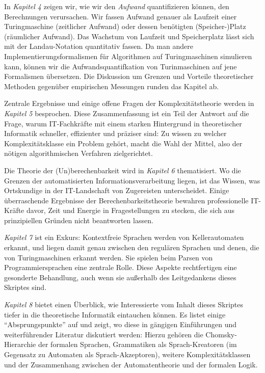 In \emph{Kapitel 4} zeigen wir, 
wie wir den \emph{Aufwand} quantifizieren können,
den Berechnungen verursachen. 
Wir fassen Aufwand genauer als Laufzeit einer Turingmaschine (zeitlicher Aufwand) 
oder dessen benötigten (Speicher-)Platz (räumlicher Aufwand).
Das Wachstum von Laufzeit und Speicherplatz lässt sich
mit der Landau-Notation quantitativ fassen.
Da man andere Implementierungsformalismen für Algorithmen auf Turingmaschinen simulieren kann,
können wir die Aufwandsquantifkation von Turinmaschinen auf jene Formalismen übersetzen.
Die Diskussion um Grenzen und Vorteile theoretischer Methoden 
gegenüber empirischen Messungen runden das Kapitel ab.

Zentrale Ergebnisse und einige offene Fragen der Komplexitätstheorie
werden in \emph{Kapitel 5} besprochen.
Diese Zusammenfassung ist ein Teil der Antwort auf die Frage,
warum IT-Fachkräfte mit einem starken Hintergrund in theoretischer Informatik
schneller, effizienter und präziser sind:
Zu wissen zu welcher Komplexitätsklasse ein Problem gehört,
macht die Wahl der Mittel,
also der nötigen algorithmischen Verfahren zielgerichtet.

Die Theorie der (Un)berechenbarkeit wird in \emph{Kapitel 6} thematisiert.
Wo die Grenzen der automatisierten Informationsverarbeitung liegen,
ist das Wissen,
was Ortskundige in der IT-Landschaft von Zugereisten unterscheidet.
Einige überraschende Ergebnisse der Berechenbarkeitstheorie
bewahren professionelle IT-Kräfte davor,
Zeit und Energie in Fragestellungen zu stecken,
die sich aus prinzipiellen Gründen nicht beantworten lassen.

\emph{Kapitel 7} ist ein Exkurs: Kontextfreie Sprachen werden von Kellerautomaten erkannt,
und liegen damit genau zwischen den regulären Sprachen
und denen, die von Turingmaschinen erkannt werden.
Sie spielen beim Parsen von Programmiersprachen eine zentrale Rolle.
Diese Aspekte rechtfertigen eine gesonderte Behandlung,
auch wenn sie außerhalb des Leitgedankens dieses Skriptes sind.

\emph{Kapitel 8} bietet einen Überblick,
wie Interessierte vom Inhalt dieses Skriptes tiefer in die theoretische Informatik
eintauchen können.
Es listet einige ``Absprungspunkte'' auf und zeigt,
wo diese in gängigen Einführungen und weiterführender Literatur diskutiert werden:
Hierzu gehören die Chomsky-Hierarchie der formalen Sprachen,
Grammatiken als Sprach-Kreatoren (im Gegensatz zu Automaten als Sprach-Akzeptoren),
weitere Komplexitätsklassen und
der Zusammenhang zwischen der Automatentheorie und der formalen Logik.

